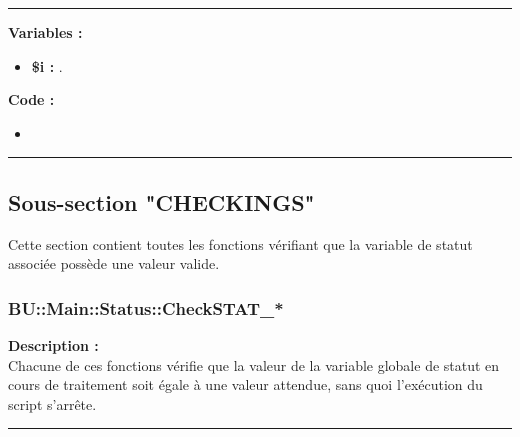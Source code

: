 \documentclass[a4paper,10pt]{article}
\begin{document}
\par\noindent\rule{\textwidth}{0.4pt}

\begin{justify}\setlength{\parskip}{1em}
    \textbf{Variables :}

    \begin{itemize}
        \item \textbf{\color{vars}\$i\color{text} :} .
    \end{itemize}
\end{justify}

\begin{justify}
    \textbf{Code :}
    \begin{itemize}
        \item 
    \end{itemize}

\end{justify}



\color{sec2}\par\noindent\rule{\textwidth}{0.4pt}\color{text}

\color{sec2}
\subsection{Sous-section "CHECKINGS"}\color{text}

\begin{justify}
    Cette section contient toutes les fonctions vérifiant que la variable de statut associée possède une valeur valide.
\end{justify}

\color{sec3}
\subsubsection{BU::Main::Status::CheckSTAT\_*}\color{text}

\begin{justify}
    \textbf{Description :}\\[1\baselineskip]
    Chacune de ces fonctions vérifie que la valeur de la variable globale de statut en cours de traitement soit égale à une valeur attendue, sans quoi l'exécution du script s'arrête.
\end{justify}\setlength{\parskip}{1em}


\par\noindent\rule{\textwidth}{0.4pt}
\end{document}
